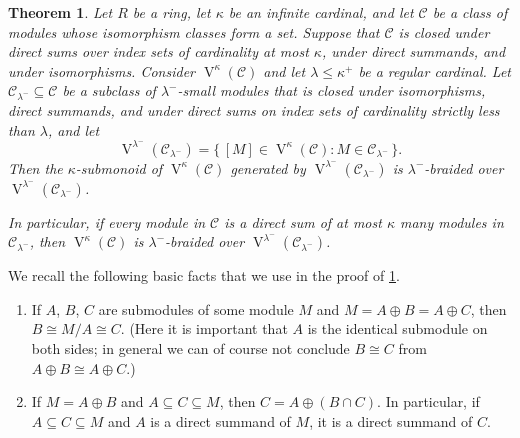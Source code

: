 \documentclass[a4paper,11pt,oneside]{amsart}
\newtheorem{teor}{Theorem}[section]
\theoremstyle{remark}
\newcommand{\cC}{\mathcal C}
\DeclareMathOperator{\Vmon}{V}
\begin{document}
\begin{teor} \label{t:module-braiding}
  Let $R$ be a ring, let $\kappa$ be an infinite cardinal, and let $\cC$ be a class of modules whose isomorphism classes form a set.
  Suppose that $\cC$ is closed under direct sums over index sets of cardinality at most $\kappa$, under direct summands, and under isomorphisms.
  Consider $\Vmon^\kappa(\cC)$ and let $\lambda \le \kappa^+$ be a regular cardinal.
  Let $\cC_{\lambda^-} \subseteq \cC$ be a subclass of $\lambda^-$-small modules that is closed under isomorphisms, direct summands, and under direct sums on index sets of cardinality strictly less than $\lambda$, and let
  \[
    \Vmon^{\lambda^-}(\cC_{\lambda^-}) = \big\{\, [M] \in \Vmon^\kappa(\cC) : M \in \cC_{\lambda^-} \,\big\}.
  \]
  Then the $\kappa$-submonoid of $\Vmon^{\kappa}(\cC)$ generated by $\Vmon^{\lambda^-}(\cC_{\lambda^-})$ is $\lambda^-$-braided over $\Vmon^{\lambda^-}(\cC_{\lambda^-})$.

  In particular, if every module in $\cC$ is a direct sum of at most $\kappa$ many modules in $\cC_{\lambda^-}$, then $\Vmon^{\kappa}(\cC)$ is $\lambda^-$-braided over $\Vmon^{\lambda^-}(\cC_{\lambda^-})$.
\end{teor}

We recall the following basic facts that we use in the proof of \cref{t:module-braiding}.
\begin{enumerate}[label=(M\arabic*),leftmargin=1.25cm] \label{m-facts}
\item \label{m-fact:cancel} If $A$, $B$, $C$ are submodules of some module $M$ and $M=A\oplus B = A \oplus C$, then $B \cong M/A \cong C$.
  (Here it is important that $A$ is the identical submodule on both sides; in general we can of course not conclude $B \cong C$ from $A \oplus B \cong A \oplus C$.)
\item \label{m-fact:summand} If $M=A\oplus B$ and $A \subseteq C \subseteq M$, then $C = A \oplus (B \cap C)$.
  In particular, if $A \subseteq C \subseteq M$ and $A$ is a direct summand of $M$, it is a direct summand of $C$.
\end{enumerate}
\end{document}
